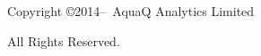 \clearpage
\thispagestyle{plain}

\begin{versionhistory}
\end{versionhistory}
\begin{center}
\vspace*{\fill}
Copyright \copyright 2014--\the\year\ AquaQ Analytics Limited\par
All Rights Reserved.
\end{center}
\clearpage
